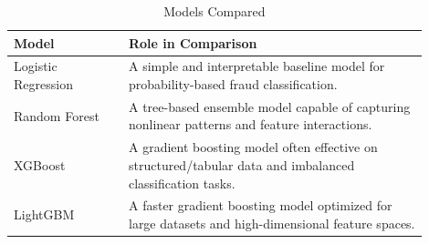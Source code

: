 \begin{table}[H]
\centering
\caption{Models Compared}
\label{tab:models_compared}
\begin{tabular}{p{0.25\linewidth} p{0.65\linewidth}}
\hline
\textbf{Model} & \textbf{Role in Comparison} \\
\hline
Logistic Regression & A simple and interpretable baseline model for probability-based fraud classification. \\
Random Forest & A tree-based ensemble model capable of capturing nonlinear patterns and feature interactions. \\
XGBoost & A gradient boosting model often effective on structured/tabular data and imbalanced classification tasks. \\
LightGBM & A faster gradient boosting model optimized for large datasets and high-dimensional feature spaces. \\
\hline
\end{tabular}
\end{table}